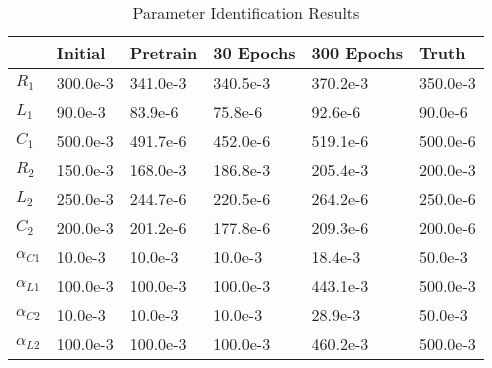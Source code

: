 \begin{table}[htbp]
\caption{Parameter Identification Results}
\label{tab:experiment1}
\centering
\begin{tabular}{l|llll|l}
\hline
 & Initial & Pretrain & 30 Epochs & 300 Epochs & Truth \\
\hline
$R_1$ & 300.0e-3 & 341.0e-3 & 340.5e-3 & 370.2e-3 & 350.0e-3\\
$L_1$ & 90.0e-3 & 83.9e-6 & 75.8e-6 & 92.6e-6 & 90.0e-6\\
$C_1$ & 500.0e-3 & 491.7e-6 & 452.0e-6 & 519.1e-6 & 500.0e-6\\
$R_2$ & 150.0e-3 & 168.0e-3 & 186.8e-3 & 205.4e-3 & 200.0e-3\\
$L_2$ & 250.0e-3 & 244.7e-6 & 220.5e-6 & 264.2e-6 & 250.0e-6\\
$C_2$ & 200.0e-3 & 201.2e-6 & 177.8e-6 & 209.3e-6 & 200.0e-6\\
$\alpha_{C1}$ & 10.0e-3 & 10.0e-3 & 10.0e-3 & 18.4e-3 & 50.0e-3\\
$\alpha_{L1}$ & 100.0e-3 & 100.0e-3 & 100.0e-3 & 443.1e-3 & 500.0e-3\\
$\alpha_{C2}$ & 10.0e-3 & 10.0e-3 & 10.0e-3 & 28.9e-3 & 50.0e-3\\
$\alpha_{L2}$ & 100.0e-3 & 100.0e-3 & 100.0e-3 & 460.2e-3 & 500.0e-3\\
\hline
\end{tabular}
\end{table}